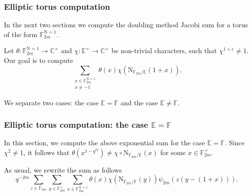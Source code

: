 \documentclass[12pt, reqno]{amsart}
\theoremstyle{definition}
\theoremstyle{definition}
\theoremstyle{definition}
\newcommand{\cComplex}{\mathbb{C}}
\newcommand{\multiplicativegroup}[1]{#1^{\times}}
\newcommand{\fieldCharacter}{\psi}
\newcommand{\involutionPlusOne}[1]{#1^{1+c}}
\newcommand{\aFieldNorm}{\mathrm{N}}
\newcommand{\finiteField}{\mathbb{F}}
\newcommand{\quadraticExtension}{\mathbb{E}}
\newcommand{\finiteFieldExtension}[1]{\finiteField_{#1}}
\newcommand{\NormOneGroup}[1]{\finiteFieldExtension{#1}^{\aFieldNorm = 1}}
\begin{document}
\subsubsection{Elliptic torus computation}
In the next two sections we compute the doubling method Jacobi sum for a torus of the form $\NormOneGroup{2m}$.

Let $\theta \colon \NormOneGroup{2m} \to \multiplicativegroup{\cComplex}$ and $\chi \colon \multiplicativegroup{\quadraticExtension} \to \multiplicativegroup{\cComplex}$ be non-trivial characters, such that $\involutionPlusOne{\chi} \ne 1$. Our goal is to compute $$\sum_{\substack{x \in \NormOneGroup{2m}\\
		x \ne -1}} \theta \left(x\right) \chi\left(\aFieldNorm_{\finiteFieldExtension{2m} \slash \quadraticExtension}\left(1 + x\right)\right).$$

We separate two cases: the case $\quadraticExtension = \finiteField$ and the case $\quadraticExtension \ne \finiteField$.

\subsubsection{Elliptic torus computation: the case $\quadraticExtension = \finiteField$}
In this section, we compute the above exponential sum for the case $\quadraticExtension = \finiteField$. Since $\chi^2 \ne 1$, it follows that $\theta\left(x^{1-q^m}\right) \ne \chi \circ \aFieldNorm_{\finiteFieldExtension{2m} \slash \quadraticExtension}\left(x\right)$ for some $x \in \multiplicativegroup{\finiteFieldExtension{2m}}$.

As usual, we rewrite the sum as follows
$$q^{-2m} \sum_{z \in \finiteFieldExtension{2m}} \sum_{y \in \multiplicativegroup{\finiteFieldExtension{2m}}} \sum_{x \in \NormOneGroup{2m}} \theta \left(x\right) \chi\left(\aFieldNorm_{\finiteFieldExtension{2m} \slash \finiteField}\left(y\right)\right) \fieldCharacter_{2m}\left(z\left(y-\left(1+x\right)\right)\right).$$
\end{document}
